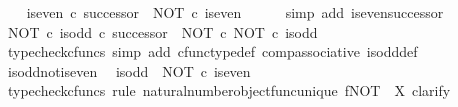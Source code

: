 \begin{isabellebody}
\isanewline
\ \ \isamarkupfalse%
\ {\isachardoublequoteopen}is{\isacharunderscore}{\kern0pt}even\ {\isasymcirc}\isactrlsub c\ successor\ {\isacharequal}{\kern0pt}\ NOT\ {\isasymcirc}\isactrlsub c\ is{\isacharunderscore}{\kern0pt}even{\isachardoublequoteclose}\isanewline
\ \ \ \ \isamarkupfalse%
\ {\isacharparenleft}{\kern0pt}simp\ add{\isacharcolon}{\kern0pt}\ is{\isacharunderscore}{\kern0pt}even{\isacharunderscore}{\kern0pt}successor{\isacharparenright}{\kern0pt}\isanewline
\isanewline
\ \ \isamarkupfalse%
\ {\isachardoublequoteopen}{\isacharparenleft}{\kern0pt}NOT\ {\isasymcirc}\isactrlsub c\ is{\isacharunderscore}{\kern0pt}odd{\isacharparenright}{\kern0pt}\ {\isasymcirc}\isactrlsub c\ successor\ {\isacharequal}{\kern0pt}\ NOT\ {\isasymcirc}\isactrlsub c\ NOT\ {\isasymcirc}\isactrlsub c\ is{\isacharunderscore}{\kern0pt}odd{\isachardoublequoteclose}\isanewline
\ \ \ \ \isamarkupfalse%
\ {\isacharparenleft}{\kern0pt}typecheck{\isacharunderscore}{\kern0pt}cfuncs{\isacharcomma}{\kern0pt}\ simp\ add{\isacharcolon}{\kern0pt}\ cfunc{\isacharunderscore}{\kern0pt}type{\isacharunderscore}{\kern0pt}def\ comp{\isacharunderscore}{\kern0pt}associative\ is{\isacharunderscore}{\kern0pt}odd{\isacharunderscore}{\kern0pt}def{}{\isacharparenright}{\kern0pt}\isanewline
{}\isamarkupfalse%
%
\endisatagproof
{\isafoldproof}%
%
\isadelimproof
\isanewline
%
\endisadelimproof
\isanewline
{}\isamarkupfalse%
\ is{\isacharunderscore}{\kern0pt}odd{\isacharunderscore}{\kern0pt}not{\isacharunderscore}{\kern0pt}is{\isacharunderscore}{\kern0pt}even{\isacharcolon}{\kern0pt}\isanewline
\ \ {\isachardoublequoteopen}is{\isacharunderscore}{\kern0pt}odd\ {\isacharequal}{\kern0pt}\ NOT\ {\isasymcirc}\isactrlsub c\ is{\isacharunderscore}{\kern0pt}even{\isachardoublequoteclose}\isanewline
%
\isadelimproof
%
\endisadelimproof
%
\isatagproof
{}\isamarkupfalse%
\ {\isacharparenleft}{\kern0pt}typecheck{\isacharunderscore}{\kern0pt}cfuncs{\isacharcomma}{\kern0pt}\ rule\ natural{\isacharunderscore}{\kern0pt}number{\isacharunderscore}{\kern0pt}object{\isacharunderscore}{\kern0pt}func{\isacharunderscore}{\kern0pt}unique{\isacharbrackleft}{\kern0pt}\ f{\isacharequal}{\kern0pt}{\isachardoublequoteopen}NOT{\isachardoublequoteclose}{\isacharcomma}{\kern0pt}\ \ X{\isacharequal}{\kern0pt}{\isachardoublequoteopen}{\isasymOmega}{\isachardoublequoteclose}{\isacharbrackright}{\kern0pt}{\isacharcomma}{\kern0pt}\ clarify{\isacharparenright}{\kern0pt}\isanewline

\end{isabellebody}
